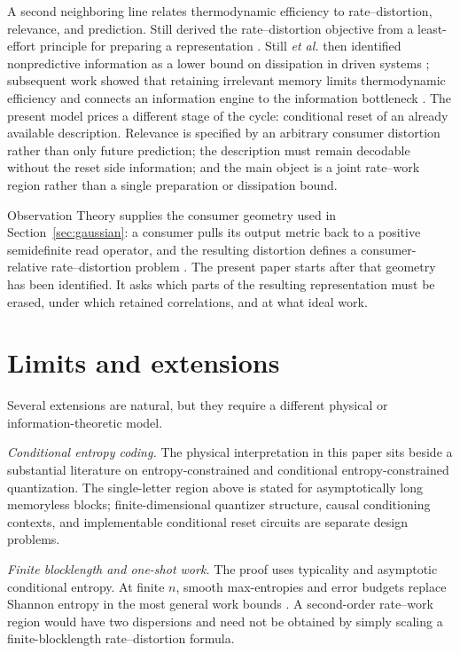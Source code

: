 \documentclass[letterpaper,onecolumn]{IEEEtran}
\theoremstyle{definition}
\theoremstyle{remark}
\newcommand{\1}{\mathbf{1}}
\begin{document}
A second neighboring line relates thermodynamic efficiency to rate--distortion,
relevance, and prediction. Still derived the rate--distortion objective from a
least-effort principle for preparing a representation \cite{still2014lossy}.
Still \emph{et al.} then identified nonpredictive information as a lower bound on
dissipation in driven systems \cite{still2012}; subsequent work showed that
retaining irrelevant memory limits thermodynamic efficiency and connects an
information engine to the information bottleneck \cite{still2020}. The present
model prices a different stage of the cycle: conditional reset of an already
available description. Relevance is specified by an arbitrary consumer
distortion rather than only future prediction; the description must remain
decodable without the reset side information; and the main object is a joint
rate--work region rather than a single preparation or dissipation bound.

Observation Theory supplies the consumer geometry used in
Section~\ref{sec:gaussian}: a consumer pulls its output metric back to a positive
semidefinite read operator, and the resulting distortion defines a
consumer-relative rate--distortion problem \cite{bond2026observation}. The
present paper starts after that geometry has been identified. It asks which
parts of the resulting representation must be erased, under which retained
correlations, and at what ideal work.

\section{Limits and extensions}\label{sec:limits}

Several extensions are natural, but they require a different physical or
information-theoretic model.

\emph{Conditional entropy coding.} The physical interpretation in this paper
sits beside a substantial literature on entropy-constrained and conditional
entropy-constrained quantization. The single-letter region above is stated for
asymptotically long memoryless blocks; finite-dimensional quantizer structure,
causal conditioning contexts, and implementable conditional reset circuits are
separate design problems.


\emph{Finite blocklength and one-shot work.} The proof uses typicality and
asymptotic conditional entropy. At finite $n$, smooth max-entropies and error
budgets replace Shannon entropy in the most general work bounds
\cite{faist2015}. A second-order rate--work region would have two dispersions and
need not be obtained by simply scaling a finite-blocklength rate--distortion
formula.
\end{document}
